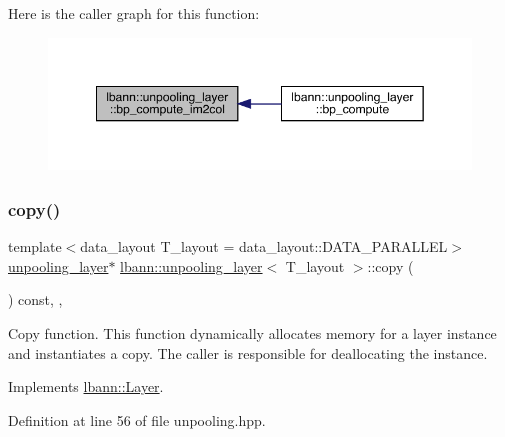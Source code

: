 Here is the caller graph for this function\+:\nopagebreak
\begin{figure}[H]
\begin{center}
\leavevmode
\includegraphics[width=349pt]{classlbann_1_1unpooling__layer_ad4607102ff59de2f233a87f13967cc04_icgraph}
\end{center}
\end{figure}
\mbox{\label{classlbann_1_1unpooling__layer_ad8458ddba48f92e2b7b8e3bacd5c801e}} 
\subsubsection{\texorpdfstring{copy()}{copy()}}
{\footnotesize\ttfamily template$<$data\+\_\+layout T\+\_\+layout = data\+\_\+layout\+::\+D\+A\+T\+A\+\_\+\+P\+A\+R\+A\+L\+L\+EL$>$ \\
\hyperlink{classlbann_1_1unpooling__layer}{unpooling\+\_\+layer}$\ast$ \hyperlink{classlbann_1_1unpooling__layer}{lbann\+::unpooling\+\_\+layer}$<$ T\+\_\+layout $>$\+::copy (\begin{DoxyParamCaption}{ }\end{DoxyParamCaption}) const\hspace{0.3cm}{\ttfamily [inline]}, {\ttfamily [override]}, {\ttfamily [virtual]}}

Copy function. This function dynamically allocates memory for a layer instance and instantiates a copy. The caller is responsible for deallocating the instance. 

Implements \hyperlink{classlbann_1_1Layer_af420f22bbac801c85483ade84588a23f}{lbann\+::\+Layer}.



Definition at line 56 of file unpooling.\+hpp.


